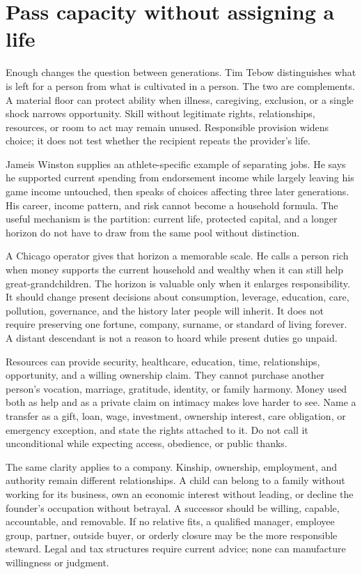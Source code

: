 \section{Pass capacity without assigning a life}

Enough changes the question between generations. Tim Tebow distinguishes what
is left for a person from what is cultivated in a person. The two are
complements. A material floor can protect ability when illness, caregiving,
exclusion, or a single shock narrows opportunity. Skill without legitimate
rights, relationships, resources, or room to act may remain unused. Responsible
provision widens
choice; it does not test whether the recipient repeats the provider's life.

Jameis Winston supplies an athlete-specific example of separating jobs. He
says he supported current spending from endorsement income while largely
leaving his game income untouched, then speaks of choices affecting three
later generations. His career, income pattern, and risk cannot become a
household formula. The useful mechanism is the partition: current life,
protected capital, and a longer horizon do not have to draw from the same
pool without distinction.

A Chicago operator gives that horizon a memorable scale. He calls a person
rich when money supports the current household and wealthy when it can still
help great-grandchildren. The horizon is valuable only when it enlarges
responsibility. It should change present decisions about consumption,
leverage, education, care, pollution, governance, and the history later people
will inherit. It does not require preserving one fortune, company, surname, or
standard of living forever. A distant descendant is not a reason to hoard
while present duties go unpaid.

Resources can provide security, healthcare, education, time, relationships,
opportunity, and a willing ownership claim. They cannot purchase another
person's vocation, marriage, gratitude, identity, or family harmony. Money
used both as help and as a private claim on intimacy makes love harder to see.
Name a transfer as a gift, loan, wage, investment, ownership interest, care
obligation, or emergency exception, and state the rights attached to it. Do
not call it unconditional while expecting access, obedience, or public thanks.

The same clarity applies to a company. Kinship, ownership, employment, and
authority remain different relationships. A child can belong to a family
without working for its business, own an economic interest without leading,
or decline the founder's occupation without betrayal. A successor should be
willing, capable, accountable, and removable. If no relative fits, a qualified
manager, employee group, partner, outside buyer, or orderly closure may be the
more responsible steward. Legal and tax structures require current advice;
none can manufacture willingness or judgment.

